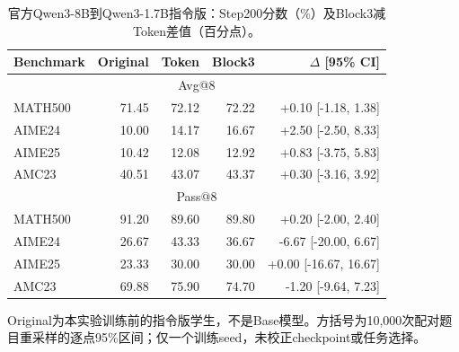 \begin{table}[t]
\centering\small
\caption{官方Qwen3-8B到Qwen3-1.7B指令版：Step200分数（\%）及Block3减Token差值（百分点）。}
\label{tab:qwen17endpoint}
\begin{tabular}{lrrrr}
\toprule
Benchmark & Original & Token & Block3 & $\Delta$ [95\% CI] \\
\midrule
\multicolumn{5}{c}{Avg@8} \\
MATH500 & 71.45 & 72.12 & 72.22 & +0.10 [-1.18, 1.38] \\
AIME24 & 10.00 & 14.17 & 16.67 & +2.50 [-2.50, 8.33] \\
AIME25 & 10.42 & 12.08 & 12.92 & +0.83 [-3.75, 5.83] \\
AMC23 & 40.51 & 43.07 & 43.37 & +0.30 [-3.16, 3.92] \\
\midrule
\multicolumn{5}{c}{Pass@8} \\
MATH500 & 91.20 & 89.60 & 89.80 & +0.20 [-2.00, 2.40] \\
AIME24 & 26.67 & 43.33 & 36.67 & -6.67 [-20.00, 6.67] \\
AIME25 & 23.33 & 30.00 & 30.00 & +0.00 [-16.67, 16.67] \\
AMC23 & 69.88 & 75.90 & 74.70 & -1.20 [-9.64, 7.23] \\
\bottomrule
\end{tabular}
\par\smallskip\footnotesize Original为本实验训练前的指令版学生，不是Base模型。方括号为10,000次配对题目重采样的逐点95\%区间；仅一个训练seed，未校正checkpoint或任务选择。
\end{table}
